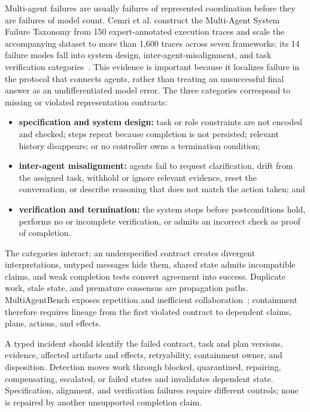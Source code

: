 Multi-agent failures are usually failures of represented coordination before they are failures of model count. Cemri et al. construct the Multi-Agent System Failure Taxonomy from 150 expert-annotated execution traces and scale the accompanying dataset to more than 1,600 traces across seven frameworks; its 14 failure modes fall into system design, inter-agent-misalignment, and task verification categories~\cite{cemri2025mast}. This evidence is important because it localizes failure in the protocol that connects agents, rather than treating an unsuccessful final answer as an undifferentiated model error. The three categories correspond to missing or violated representation contracts:
\begin{itemize}
    \item \textbf{specification and system design:} task or role constraints are not encoded and checked; steps repeat because completion is not persisted; relevant history disappears; or no controller owns a termination condition;
    \item \textbf{inter-agent misalignment:} agents fail to request clarification, drift from the assigned task, withhold or ignore relevant evidence, reset the conversation, or describe reasoning that does not match the action taken; and
    \item \textbf{verification and termination:} the system stops before postconditions hold, performs no or incomplete verification, or admits an incorrect check as proof of completion.
\end{itemize}

The categories interact: an underspecified contract creates divergent interpretations, untyped messages hide them, shared state admits incompatible claims, and weak completion tests convert agreement into success. Duplicate work, stale state, and premature consensus are propagation paths. MultiAgentBench exposes repetition and inefficient collaboration~\cite{zhu2025multiagentbench}; containment therefore requires lineage from the first violated contract to dependent claims, plans, actions, and effects.

A typed incident should identify the failed contract, task and plan versions, evidence, affected artifacts and effects, retryability, containment owner, and disposition. Detection moves work through blocked, quarantined, repairing, compensating, escalated, or failed states and invalidates dependent state. Specification, alignment, and verification failures require different controls; none is repaired by another unsupported completion claim.

